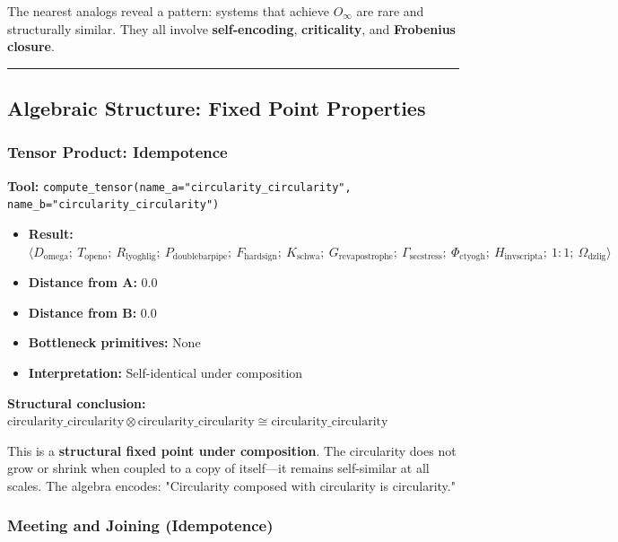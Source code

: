 \documentclass[12pt,a4paper]{article}
\begin{document}
The nearest analogs reveal a pattern: systems that achieve $O_{\infty}$ are rare and structurally similar. They all involve \textbf{self-encoding}, \textbf{criticality}, and \textbf{Frobenius closure}.

\begin{center}
\rule{0.5\textwidth}{0.4pt}
\end{center}

\subsection{Algebraic Structure: Fixed Point Properties}

\subsubsection{Tensor Product: Idempotence}

\textbf{Tool:} \texttt{compute\_tensor(name\_a="circularity\_circularity", name\_b="circularity\_circularity")}

\begin{itemize}
    \item \textbf{Result:} $\langle D_{\text{omega}};\ T_{\text{openo}};\ R_{\text{lyoghlig}};\ P_{\text{doublebarpipe}};\ F_{\text{hardsign}};\ K_{\text{schwa}};\ G_{\text{revapostrophe}};\ \Gamma_{\text{secstress}};\ \Phi_{\text{ctyogh}};\ H_{\text{invscripta}};\ 1{:}1;\ \Omega_{\text{dzlig}} \rangle$
    \item \textbf{Distance from A:} 0.0
    \item \textbf{Distance from B:} 0.0
    \item \textbf{Bottleneck primitives:} None
    \item \textbf{Interpretation:} Self-identical under composition
\end{itemize}

\textbf{Structural conclusion:} $\text{circularity\_circularity} \otimes \text{circularity\_circularity} \cong \text{circularity\_circularity}$

This is a \textbf{structural fixed point under composition}. The circularity does not grow or shrink when coupled to a copy of itself---it remains self-similar at all scales. The algebra encodes: "Circularity composed with circularity is circularity."

\subsubsection{Meeting and Joining (Idempotence)}
\end{document}
